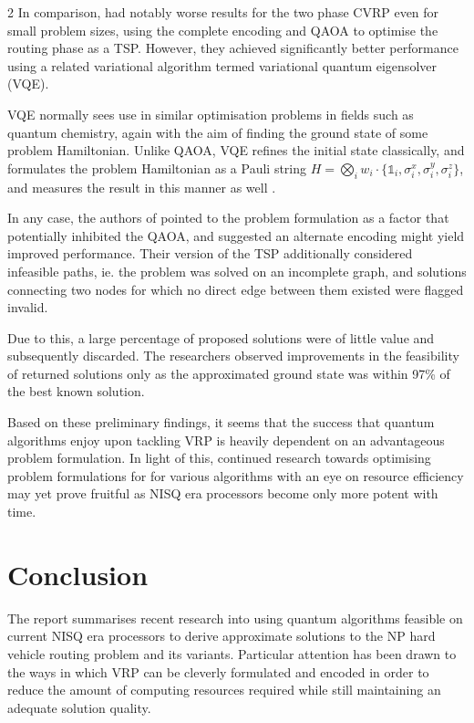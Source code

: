 \documentclass [10pt]{article}
\begin{document}
\begin {multicols}{2}
In comparison, \cite{cvrpqaoa} had notably worse results for the two phase
CVRP even for small problem sizes, using the complete encoding and QAOA to
optimise the routing phase as a TSP. However, they achieved significantly
better performance using a related variational algorithm termed variational
quantum eigensolver (VQE).

VQE normally sees use in similar optimisation problems in fields such as
quantum chemistry, again with the aim of finding the ground state of some
problem Hamiltonian. Unlike QAOA, VQE refines the initial state classically,
and formulates the problem Hamiltonian as a Pauli string $H = \bigotimes_i w_i
\cdot \{\mathbb{1}_i, \sigma^x_i, \sigma^y_i, \sigma^z_i\}$, and measures the
result in this manner as well \cite{vqe}.

In any case, the authors of \cite{cvrpqaoa} pointed to the problem formulation
as a factor that potentially inhibited the QAOA, and suggested an alternate
encoding might yield improved performance. Their version of the TSP
additionally considered infeasible paths, ie. the problem was solved on an
incomplete graph, and solutions connecting two nodes for which no direct edge
between them existed were flagged invalid.

Due to this, a large percentage of proposed solutions were of little value
and subsequently discarded. The researchers observed improvements in the
feasibility of returned solutions only as the approximated ground state was
within 97\% of the best known solution.

Based on these preliminary findings, it seems that the success that quantum
algorithms enjoy upon tackling VRP is heavily dependent on an advantageous
problem formulation. In light of this, continued research towards optimising
problem formulations for for various algorithms with an eye on resource
efficiency may yet prove fruitful as NISQ era processors become only more
potent with time.

\section {Conclusion}
The report summarises recent research into using quantum algorithms 
feasible on current NISQ era processors to derive approximate solutions to the
NP hard vehicle routing problem and its variants. Particular attention has been
drawn to the ways in which VRP can be cleverly formulated and encoded in order
to reduce the amount of computing resources required while still maintaining
an adequate solution quality.


\end{multicols}
\end{document}
